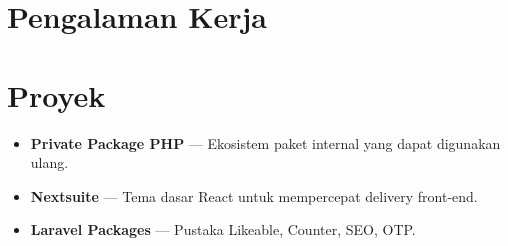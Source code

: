 \documentclass[11pt,a4paper]{article}
\begin{document}

\section*{Pengalaman Kerja}

\section*{Proyek}
\begin{itemize}
  \item \textbf{Private Package PHP} --- Ekosistem paket internal yang dapat digunakan ulang.
  \item \textbf{Nextsuite} --- Tema dasar React untuk mempercepat delivery front-end.
  \item \textbf{Laravel Packages} --- Pustaka Likeable, Counter, SEO, OTP.
\end{itemize}

\end{document}
